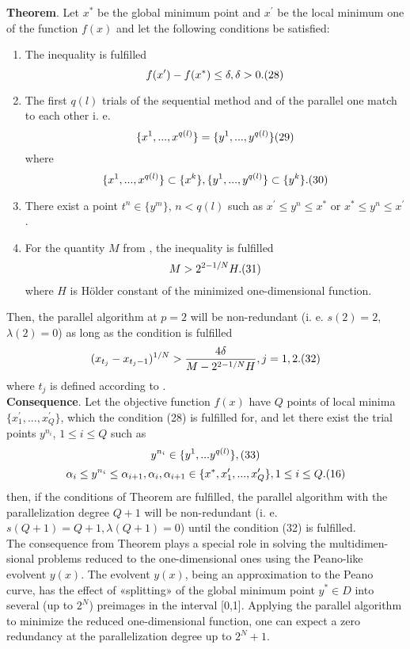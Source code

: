 \documentclass[runningheads]{llncs}
\begin{document}
\textbf{Theorem}. Let $x^*$ be the global minimum point and $x^{\prime}$ be the local minimum one of the function $f(x)$ and let the following conditions be satisfied:
    \begin{enumerate}
        \item The inequality is fulfilled
        $$ f(x^{\prime}) - f(x^*) \leq \delta, \delta > 0. \relax(28)$$
        \item The first $q(l)$ trials of the sequential method and of the parallel one match to each other i. e.
        $$ \{x^1,...,x^{q(l)}\} = \{y^1,...,y^{q(l)}\} \relax(29)$$
        where
         $$ \{x^1,...,x^{q(l)}\} \subset \{x^k\}, \{y^1,...,y^{q(l)}\}\subset \{y^k\}. \relax(30)$$
        \item There exist a point $t^n \in \{y^m\}$, $n < q(l)$ such as $x^{\prime} \leq y^n \leq x^*$ or $x^* \leq y^n \leq x^{\prime}$.
        \item For the quantity $M$ from \cite{}, the inequality is fulfilled 
        $$ M > 2^{2 - 1/N} H. \relax(31)$$
        where $H$ is Hölder constant of the minimized one-dimensional function.
    \end{enumerate}
Then, the parallel algorithm at $p=2$ will be non-redundant (i. e. $s(2)=2$, $\lambda(2)=0$) as long as the condition is fulfilled 
$$ (x_{t_j} - x_{t_j - 1})^{1/N} > \frac{4\delta}{M - 2^{2 - 1/N} H}, j=1,2. \eqno(32)$$
where $t_j$ is defined according to \cite{}.\\
\textbf{Consequence}. Let the objective function $f(x)$ have $Q$ points of local minima $\{x_1^{\prime},...,x_Q^{\prime}\}$, which the condition (28) is fulfilled for, and let there exist the trial points $y^{n_i}$, $1 \leq i \leq Q$ such as 
$$ y^{n_i} \in \{y^1,...y^{q(l)}\}, \relax(33)$$
$$ \alpha_i \leq y^{n_i} \leq \alpha_{i+1}, \alpha_i, \alpha_{i+1} \in \{x^*, x_1^{\prime},...,x_Q^{\prime}\}, 1 \leq i \leq Q. \relax(16)$$
then, if the conditions of Theorem are fulfilled, the parallel algorithm with the parallelization degree $Q+1$ will be non-redundant (i. e. $s(Q+1)=Q+1, \lambda(Q+1)=0$) until the condition (32) is fulfilled.\\
The consequence from Theorem plays a special role in solving the multidimen-sional problems reduced to the one-dimensional ones using the Peano-like evolvent $y(x)$. The evolvent $y(x)$, being an approximation to the Peano curve, has the effect of «splitting» of the global minimum point $y^* \in D$ into several (up to $2^N$) preimages in the interval [0,1]. Applying the parallel algorithm to minimize the reduced one-dimensional function, one can expect a zero redundancy at the parallelization degree up to $2^N+1$.\\
\end{document}
